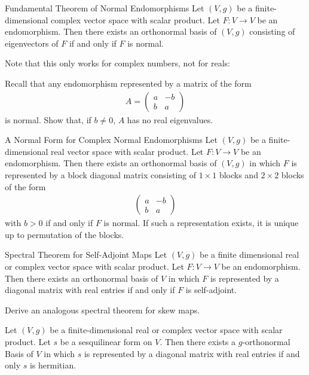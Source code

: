 \begin{importanttheorem}{Fundamental Theorem of Normal Endomorphisms}{}
	Let $(V,g)$ be a finite-dimensional complex vector space with scalar product. Let $F : V \to V$ be an endomorphism. Then there exists an orthonormal basis of $(V,g)$ consisting of eigenvectors of $F$ if and only if $F$ is normal.
\end{importanttheorem}
Note that this only works for complex numbers, not for reals:
\begin{exercise}
	Recall that any endomorphism represented by a matrix of the form
	\begin{align*}
		A
		=
		\begin{pmatrix}
			a & -b\\
			b & a
		\end{pmatrix}
	\end{align*}
	is normal. Show that, if $b \neq 0$, $A$ has no real eigenvalues.
\end{exercise}
\begin{importantcorollary}{A Normal Form for Complex Normal Endomorphisms}{}
	Let $(V,g)$ be a finite-dimensional real vector space with scalar product. Let $F : V \to V$ be an endomorphism. Then there exists an orthonormal basis of $(V,g)$ in which $F$ is represented by a block diagonal matrix consisting of $1 \times 1$ blocks and $2 \times 2$ blocks of the form
	\begin{align*}
		\begin{pmatrix}
			a & -b\\
			b & a
		\end{pmatrix}
	\end{align*}
	with $b > 0$ if and only if $F$ is normal. If such a representation exists, it is unique up to permutation of the blocks.
\end{importantcorollary}
\begin{importantcorollary}{Spectral Theorem for Self-Adjoint Maps}{}
	Let $(V,g)$ be a finite dimensional real or complex vector space with scalar product. Let $F : V \to V$ be an endomorphism. Then there exists an orthonormal basis of $V$ in which $F$ is represented by a diagonal matrix with real entries if and only if $F$ is self-adjoint.
\end{importantcorollary}
\begin{exercise}
	Derive an analogous spectral theorem for skew maps.
\end{exercise}
\begin{corollary}
	Let $(V,g)$ be a finite-dimensional real or complex vector space with scalar product. Let $s$ be a sesquilinear form on $V$. Then there exists a $g$-orthonormal Basis of $V$ in which $s$ is represented by a diagonal matrix with real entries if and only $s$ is hermitian.
\end{corollary}
